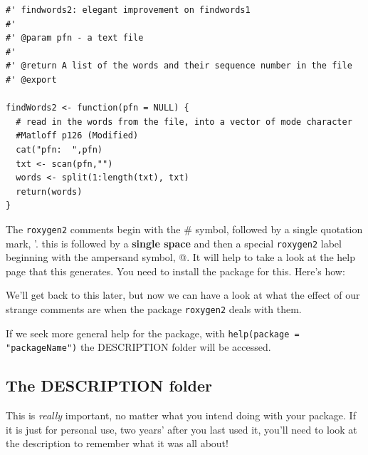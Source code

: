 \documentclass[titlepage]{book}\usepackage{knitr}
\begin{document}
\begin{lstlisting}
#' findwords2: elegant improvement on findwords1
#'
#' @param pfn - a text file
#'
#' @return A list of the words and their sequence number in the file
#' @export

findWords2 <- function(pfn = NULL) {
  # read in the words from the file, into a vector of mode character
  #Matloff p126 (Modified)
  cat("pfn:  ",pfn)
  txt <- scan(pfn,"")
  words <- split(1:length(txt), txt)
  return(words)
}

\end{lstlisting}

The \texttt{roxygen2} comments begin with the \# symbol, followed by a single quotation mark, '. this is followed by a \textbf{single space} and then a special \texttt{roxygen2} label beginning with the ampersand symbol, @.  It will help to take a look at the help page that this generates.  You need to install the package for this.  Here's how:

\begin{knitrout}
\color{fgcolor}\begin{kframe}
\begin{alltt}
\hlopt{::}\hlstd{(}\hlstd{)}
\end{alltt}
\end{kframe}
\end{knitrout}
We'll get back to this later, but now we can have a look at what the effect of our strange comments are when the package \texttt{roxygen2} deals with them.

\begin{knitrout}
\color{fgcolor}\begin{kframe}
\begin{alltt}
\end{alltt}
\end{kframe}
\end{knitrout}

If we seek more general help for the package, with \texttt{help(package = "packageName")} the DESCRIPTION folder will be accessed.


\subsection{ The DESCRIPTION folder}
This is \emph{really} important, no matter what you intend doing with your package. If it is just for personal use,  two years' after you last used it, you'll need to look at the description to remember what it was all about!
\end{document}
